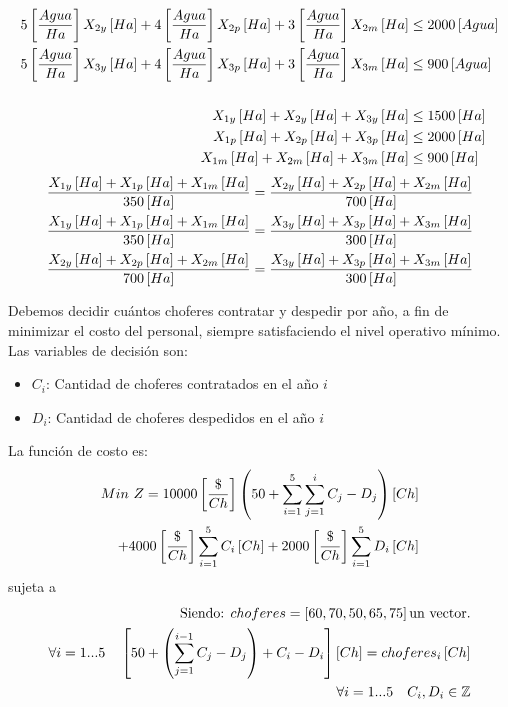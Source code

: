 \documentclass{tarea}
\begin{document}
\begin{homeworkProblem}[-1][Agropecuario]
\begin{align*}
5\left[ \frac{Agua}{Ha} \right]X_{2y}\left[ Ha \right] + 4\left[ \frac{Agua}{Ha} \right]X_{2p}\left[ Ha \right] + 3\left[ \frac{Agua}{Ha} \right]X_{2m}\left[ Ha \right] &\le 2000\left[ Agua \right] \\
5\left[ \frac{Agua}{Ha} \right]X_{3y}\left[ Ha \right] + 4\left[ \frac{Agua}{Ha} \right]X_{3p}\left[ Ha \right] + 3\left[ \frac{Agua}{Ha} \right]X_{3m}\left[ Ha \right] &\le 900\left[ Agua \right] \\
\\
X_{1y}\left[ Ha \right] + X_{2y}\left[ Ha \right] + X_{3y}\left[ Ha \right] &\le 1500\left[ Ha \right] \\
X_{1p}\left[ Ha \right] + X_{2p}\left[ Ha \right] + X_{3p}\left[ Ha \right] &\le 2000\left[ Ha \right] \\
X_{1m}\left[ Ha \right] + X_{2m}\left[ Ha \right] + X_{3m}\left[ Ha \right] &\le 900\left[ Ha \right] \\
\end{align*}
\begin{align*}
\frac{X_{1y}\left[ Ha \right] + X_{1p}\left[ Ha \right] + X_{1m}\left[ Ha \right]}{350\left[ Ha \right]} &= \frac{X_{2y}\left[ Ha \right] + X_{2p}\left[ Ha \right] + X_{2m}\left[ Ha \right]}{700\left[ Ha \right]}\\
\frac{X_{1y}\left[ Ha \right] + X_{1p}\left[ Ha \right] + X_{1m}\left[ Ha \right]}{350\left[ Ha \right]} &= \frac{X_{3y}\left[ Ha \right] + X_{3p}\left[ Ha \right] + X_{3m}\left[ Ha \right]}{300\left[ Ha \right]}\\
\frac{X_{2y}\left[ Ha \right] + X_{2p}\left[ Ha \right] + X_{2m}\left[ Ha \right]}{700\left[ Ha \right]} &= \frac{X_{3y}\left[ Ha \right] + X_{3p}\left[ Ha \right] + X_{3m}\left[ Ha \right]}{300\left[ Ha \right]}
\end{align*}
\end{homeworkProblem}


\begin{homeworkProblem}[-1][Ómnibus]
Debemos decidir cuántos choferes contratar y despedir por año, a fin de minimizar el costo del personal, siempre satisfaciendo el nivel operativo mínimo.
Las variables de decisión son:
\begin{itemize}
\item $C_i$: Cantidad de choferes contratados en el año $i$
\item $D_i$: Cantidad de choferes despedidos en el año $i$
\end{itemize}
La función de costo es:
\begin{align*}
Min\ Z = 10000\left[ \frac{\$}{Ch} \right]\left(50 + \sum_{i=1}^{5}{\sum_{j=1}^{i}{C_j-D_j}}\right)\left[ Ch \right] \\
+ 4000\left[ \frac{\$}{Ch} \right]\sum_{i=1}^{5}{C_i}\left[ Ch \right] + 2000\left[ \frac{\$}{Ch} \right]\sum_{i=1}^{5}{D_i}\left[ Ch \right]
\end{align*}
sujeta a
\begin{align*}
\text{Siendo: } choferes = \left[ 60, 70, 50,65,75 \right] \text{un vector.}\\
\forall i=1...5\quad \left[ 50 + \left(\sum_{j=1}^{i-1}{C_j-D_j} \right) + C_i - D_i \right]\left[ Ch \right] = choferes_i\left[ Ch \right] \\
\forall i=1...5\quad C_i,D_i \in \mathbb{Z}
\end{align*}
\end{homeworkProblem}
\end{document}
